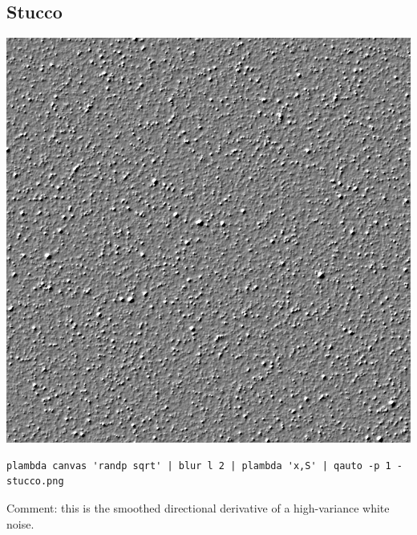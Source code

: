 \subsection{Stucco}
\includegraphics{stucco.png}
\begin{verbatim}
plambda canvas 'randp sqrt' | blur l 2 | plambda 'x,S' | qauto -p 1 - stucco.png
\end{verbatim}
Comment: this is the smoothed directional derivative of a high-variance white
noise.

